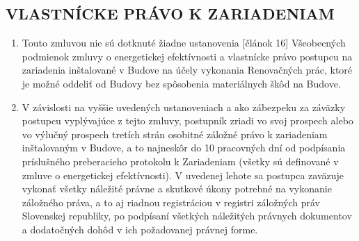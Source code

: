 \documentclass[a4paper]{article}
\begin{document}
\begin{multicols}{2}
\subsection{VLASTNÍCKE PRÁVO K ZARIADENIAM}
\begin{enumerate}
\item Touto zmluvou nie sú dotknuté žiadne ustanovenia [článok 16] Všeobecných podmienok zmluvy o energetickej efektívnosti a vlastnícke právo postupcu na zariadenia inštalované v Budove na účely vykonania Renovačných prác, ktoré je možné oddeliť od Budovy bez spôsobenia materiálnych škôd na Budove.
\item V závislosti na vyššie uvedených ustanoveniach a ako zábezpeku za záväzky postupcu vyplývajúce z tejto zmluvy, postupník zriadi vo svoj prospech alebo vo výlučný prospech tretích strán osobitné záložné právo k zariadeniam inštalovaným v Budove, a to najneskôr do 10 pracovných dní od podpísania príslušného preberacieho protokolu k Zariadeniam (všetky sú definované v zmluve o energetickej efektívnosti). V uvedenej lehote sa postupca zaväzuje vykonať všetky náležité právne a skutkové úkony potrebné na vykonanie záložného práva, a to aj riadnou registráciou v registri záložných práv Slovenskej republiky, po podpísaní všetkých náležitých právnych dokumentov a dodatočných dohôd v ich požadovanej právnej forme.
\end{enumerate}

\end{multicols}
\end{document}
